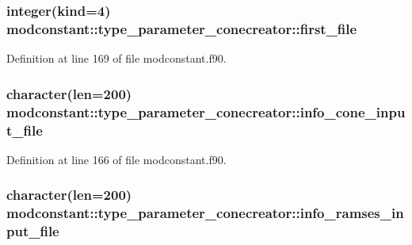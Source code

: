 \subsubsection[{\texorpdfstring{first\+\_\+file}{first_file}}]{\setlength{\rightskip}{0pt plus 5cm}integer(kind=4) modconstant\+::type\+\_\+parameter\+\_\+conecreator\+::first\+\_\+file}\hypertarget{structmodconstant_1_1type__parameter__conecreator_a2378ef5e20c6ff83414d69b9c19c0bbd}{}\label{structmodconstant_1_1type__parameter__conecreator_a2378ef5e20c6ff83414d69b9c19c0bbd}


Definition at line 169 of file modconstant.\+f90.

\subsubsection[{\texorpdfstring{info\+\_\+cone\+\_\+input\+\_\+file}{info_cone_input_file}}]{\setlength{\rightskip}{0pt plus 5cm}character(len=200) modconstant\+::type\+\_\+parameter\+\_\+conecreator\+::info\+\_\+cone\+\_\+input\+\_\+file}\hypertarget{structmodconstant_1_1type__parameter__conecreator_a5f8f89332e28a5774a6bc136b842cdd9}{}\label{structmodconstant_1_1type__parameter__conecreator_a5f8f89332e28a5774a6bc136b842cdd9}


Definition at line 166 of file modconstant.\+f90.

\subsubsection[{\texorpdfstring{info\+\_\+ramses\+\_\+input\+\_\+file}{info_ramses_input_file}}]{\setlength{\rightskip}{0pt plus 5cm}character(len=200) modconstant\+::type\+\_\+parameter\+\_\+conecreator\+::info\+\_\+ramses\+\_\+input\+\_\+file}\hypertarget{structmodconstant_1_1type__parameter__conecreator_aa2e7ccb48f0190fad5e9900b5b1b4d63}{}\label{structmodconstant_1_1type__parameter__conecreator_aa2e7ccb48f0190fad5e9900b5b1b4d63}



